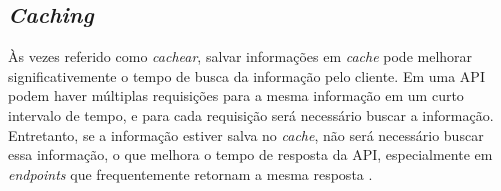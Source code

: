 


\subsection{\emph{Caching}}
Às vezes referido como \emph{cachear}, salvar informações em \emph{cache} pode melhorar significativemente o tempo de busca da informação pelo cliente. Em uma API podem haver múltiplas requisições para a mesma informação em um curto intervalo de tempo, e para cada requisição será necessário buscar a informação. Entretanto, se a informação estiver salva no \emph{cache}, não será necessário buscar essa informação, o que melhora o tempo de resposta da API, especialmente em \emph{endpoints} que frequentemente retornam a mesma resposta \cite{api-design-restfulapi}.

